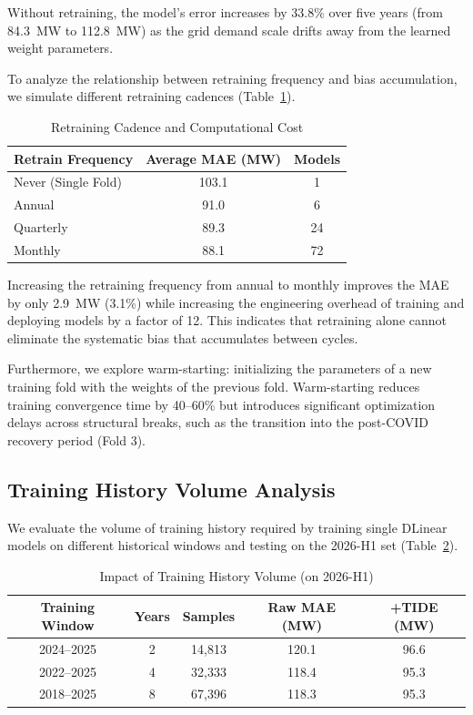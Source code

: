 \documentclass[10pt,twocolumn,letterpaper]{article}
\begin{document}
Without retraining, the model's error increases by 33.8\% over five years (from 84.3~MW to 112.8~MW) as the grid demand scale drifts away from the learned weight parameters.

To analyze the relationship between retraining frequency and bias accumulation, we simulate different retraining cadences (Table~\ref{tab:retrain_frequency}).

\begin{table}[h]
\centering
\small
\setlength{\tabcolsep}{6pt}
\caption{Retraining Cadence and Computational Cost}
\label{tab:retrain_frequency}
\begin{tabular}{@{}lcc@{}}
\toprule
\textbf{Retrain Frequency} & \textbf{Average MAE (MW)} & \textbf{Models} \\ \midrule
Never (Single Fold) & 103.1 & 1 \\
Annual & 91.0 & 6 \\
Quarterly & 89.3 & 24 \\
Monthly & 88.1 & 72 \\ \bottomrule
\end{tabular}
\end{table}

Increasing the retraining frequency from annual to monthly improves the MAE by only 2.9~MW (3.1\%) while increasing the engineering overhead of training and deploying models by a factor of 12. This indicates that retraining alone cannot eliminate the systematic bias that accumulates between cycles.

Furthermore, we explore warm-starting: initializing the parameters of a new training fold with the weights of the previous fold. Warm-starting reduces training convergence time by 40--60\% but introduces significant optimization delays across structural breaks, such as the transition into the post-COVID recovery period (Fold 3).

\subsection{Training History Volume Analysis}
We evaluate the volume of training history required by training single DLinear models on different historical windows and testing on the 2026-H1 set (Table~\ref{tab:history_volume}).

\begin{table}[h]
\centering
\small
\setlength{\tabcolsep}{4pt}
\caption{Impact of Training History Volume (on 2026-H1)}
\label{tab:history_volume}
\begin{tabular}{@{}ccccc@{}}
\toprule
\textbf{Training Window} & \textbf{Years} & \textbf{Samples} & \textbf{Raw MAE (MW)} & \textbf{+TIDE (MW)} \\ \midrule
2024--2025 & 2 & 14,813 & 120.1 & 96.6 \\
2022--2025 & 4 & 32,333 & 118.4 & 95.3 \\
2018--2025 & 8 & 67,396 & 118.3 & 95.3 \\ \bottomrule
\end{tabular}
\end{table}
\end{document}
